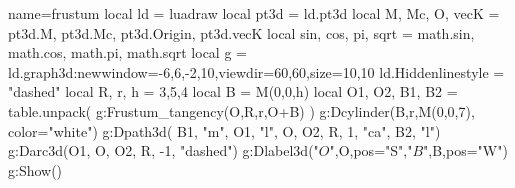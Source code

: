 \documentclass[border=2pt,12pt]{standalone}%
\begin{document}
\begin{luadraw}{name=frustum}
local ld = luadraw
local pt3d = ld.pt3d
local M, Mc, O, vecK = pt3d.M, pt3d.Mc, pt3d.Origin,  pt3d.vecK
local sin, cos, pi, sqrt = math.sin, math.cos, math.pi, math.sqrt
local g = ld.graph3d:new{window={-6,6,-2,10},viewdir={60,60},size={10,10}}
ld.Hiddenlinestyle = "dashed"
local R, r, h = 3,5,4
local B = M(0,0,h)
local O1, O2, B1, B2 = table.unpack( g:Frustum_tangency(O,R,r,O+B) )
g:Dcylinder(B,r,M(0,0,7), {color="white"}) 
g:Dpath3d( {B1, "m", O1, "l", O, O2, R, 1, "ca", B2, "l"})
g:Darc3d(O1, O, O2, R, -1, "dashed")
g:Dlabel3d("$O$",O,{pos="S"},"$B$",B,{pos="W"})
g:Show()
\end{luadraw}
\end{document}

